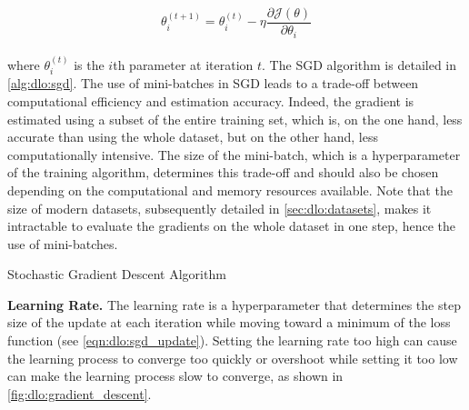 \begin{equation}
\label{eqn:dlo:sgd_update}
\theta_i^{(t+1)} = \theta_i^{(t)} - \eta \frac{\partial \mathcal{J}(\theta)}{\partial \theta_i}
\end{equation}\\

\noindent where $\theta_i^{(t)}$ is the $i$th parameter at iteration $t$. The
\ac{SGD} algorithm is detailed in \cref{alg:dlo:sgd}. The use of mini-batches in
\ac{SGD} leads to a trade-off between computational efficiency and estimation
accuracy. Indeed, the gradient is estimated using a subset of the entire
training set, which is, on the one hand, less accurate than using the whole
dataset, but on the other hand, less computationally intensive. The size of the
mini-batch, which is a hyperparameter of the training algorithm, determines this
trade-off and should also be chosen depending on the computational and memory
resources available. Note that the size of modern datasets, subsequently
detailed in \cref{sec:dlo:datasets}, makes it intractable to evaluate the
gradients on the whole dataset in one step, hence the use of mini-batches.\\

\begin{algorithm}
  \caption{Stochastic Gradient Descent Algorithm}
  \label{alg:dlo:sgd}
  \begin{algorithmic}
      
      \ENDWHILE {}
  \end{algorithmic}
\end{algorithm}


\noindent \textbf{Learning Rate.} The learning rate is a hyperparameter that
determines the step size of the update at each iteration while moving toward a
minimum of the loss function (see \cref{eqn:dlo:sgd_update}). Setting the
learning rate too high can cause the learning process to converge too quickly or
overshoot while setting it too low can make the learning process slow to
converge, as shown in \cref{fig:dlo:gradient_descent}.\\

